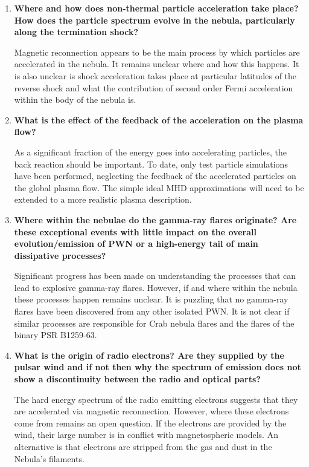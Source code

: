 \begin{enumerate}

\item \textbf{Where and how does non-thermal particle acceleration take place? How does the particle spectrum evolve in the nebula, particularly along the termination shock? }

Magnetic reconnection appears to be the main process by which particles are accelerated in the nebula. It remains unclear where and how this happens. It is also unclear is shock acceleration takes place at particular latitudes of the reverse shock and what the contribution of second order Fermi acceleration within the body of the nebula is.

\item \textbf{What is the effect of the feedback of the acceleration on the plasma flow?}

As a significant fraction of the energy goes into accelerating particles, the back reaction should be important. To date, only test particle simulations have been performed, neglecting the feedback of the accelerated particles on the global plasma flow. The simple ideal MHD approximations will need to be extended to a more realistic plasma description.

\item \textbf{Where within the nebulae do the gamma-ray flares originate? Are these exceptional events with little impact on the overall evolution/emission of PWN or a high-energy tail of main dissipative processes?  }

Significant progress has been made on understanding the processes that can lead to explosive gamma-ray flares. However, if and where within the nebula these processes happen remains unclear. It is puzzling that no gamma-ray flares have been discovered from any other isolated PWN. It is not clear if similar processes are responsible for Crab nebula flares and the flares of the binary PSR B1259-63.

\item \textbf{What is the origin of radio electrons? Are they supplied by the pulsar wind and if not then why the spectrum of emission does not show a discontinuity between the radio and optical parts? }

The hard energy spectrum of the radio emitting electrons suggests that they are accelerated via magnetic reconnection. However, where these electrons come from remains an open question. If the electrons are provided by the wind, their large number is in conflict with magnetospheric models. An alternative is that electrons are stripped from the gas and dust in the Nebula's filaments.


\end{enumerate}
